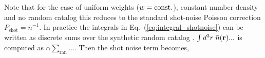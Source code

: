                                                                                                                                                                                                                                                                         \noindent Note that for the case of uniform weights ($w={\rm const.}$), 
                                                                                                                                                                                                                                                                        constant number density and no random catalog this reduces to the standard 
                                                                                                                                                                                                                                                                        shot-noise Poisson correction $P_\mathrm{shot} =\bar{n}^{-1}$. 
                                                                                                                                                                                                                                                                        In practice the integrals in Eq.~(\ref{eq:integral_shotnoise}) can be 
                                                                                                                                                                                                                                                                        written as discrete sums over the synthetic random catalog 
                                                                                                                                                                                                                                                                        \citep{Feldman:1994aa}. $\int d^3r \; \bar{n}({\bf r}) ...$ 
                                                                                                                                                                                                                                                                        is computed as $\alpha \sum_{\mathrm{ran}}...$. Then the shot noise term 
                                                                                                                                                                                                                                                                        becomes, 

